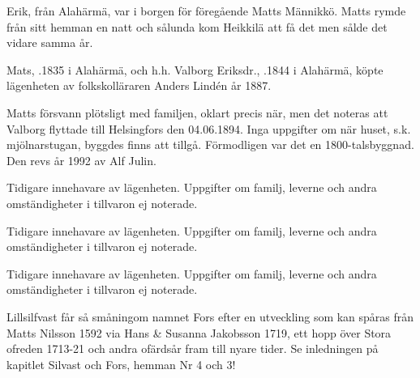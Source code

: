 
Erik, från Alahärmä, var i borgen för föregående Matts Männikkö. Matts rymde från sitt hemman en natt och sålunda kom Heikkilä att få det men sålde det vidare samma år.



Mats, .1835 i Alahärmä, och h.h. Valborg Eriksdr., .1844 i Alahärmä, köpte lägenheten av folkskolläraren Anders Lindén år 1887.

\begin{jhchildren}
  \item {}
  \item {}
  \item {}
  \item {}
  \item {}
\end{jhchildren}

Matts försvann plötsligt med familjen, oklart precis när, men det noteras att Valborg flyttade till Helsingfors den 04.06.1894. Inga uppgifter om när huset, s.k. mjölnarstugan, byggdes finns att tillgå. Förmodligen var det en 1800-talsbyggnad. Den revs år 1992 av Alf Julin.



Tidigare innehavare av lägenheten. Uppgifter om familj, leverne och andra omständigheter i tillvaron ej noterade.



Tidigare innehavare av lägenheten. Uppgifter om familj, leverne och andra omständigheter i tillvaron ej noterade.



Tidigare innehavare av lägenheten. Uppgifter om familj, leverne och andra omständigheter i tillvaron ej noterade.



Lillsilfvast får så småningom namnet Fors efter en utveckling som kan spåras från Matts Nilsson 1592 via Hans \& Susanna Jakobsson 1719, ett hopp över Stora ofreden 1713-21 och andra ofärdsår fram till nyare tider. Se inledningen på kapitlet Silvast och Fors, hemman Nr 4 och 3!


